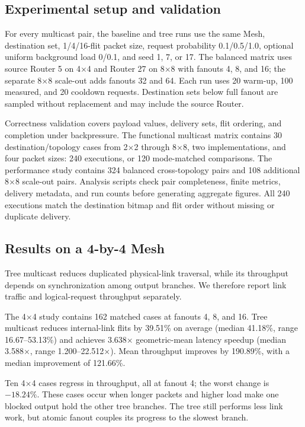 \documentclass[10pt]{article}
\begin{document}
\subsection{Experimental setup and validation}

For every multicast pair, the baseline and tree runs use the same Mesh,
destination set, 1/4/16-flit packet size, request probability
0.1/0.5/1.0, optional uniform background load 0/0.1, and seed 1, 7, or 17.
The balanced matrix uses source Router 5 on 4$\times$4 and Router 27 on
8$\times$8 with fanouts 4, 8, and 16; the separate 8$\times$8 scale-out adds
fanouts 32 and 64.  Each run uses 20 warm-up, 100 measured, and 20 cooldown
requests.  Destination sets below full fanout are sampled without replacement
and may include the source Router.

Correctness validation covers payload values, delivery sets, flit ordering,
and completion under backpressure.  The functional multicast matrix contains
30 destination/topology cases from 2$\times$2 through 8$\times$8, two
implementations, and four packet sizes: 240 executions, or 120 mode-matched
comparisons.  The performance study contains 324 balanced cross-topology pairs
and 108 additional 8$\times$8 scale-out pairs.
Analysis scripts check pair completeness, finite metrics, delivery metadata,
and run counts before generating aggregate figures.  All 240 executions match
the destination bitmap and flit order without missing or duplicate delivery.

\subsection{Results on a 4-by-4 Mesh}


Tree multicast reduces duplicated physical-link traversal, while its throughput
depends on synchronization among output branches.  We therefore report link
traffic and logical-request throughput separately.

The 4$\times$4 study contains 162 matched cases at fanouts 4, 8, and 16.  Tree
multicast reduces internal-link flits by 39.51\% on average (median 41.18\%,
range 16.67--53.13\%) and achieves 3.638$\times$ geometric-mean latency
speedup (median 3.588$\times$, range 1.200--22.512$\times$).  Mean throughput
improves by 190.89\%, with a median improvement of 121.66\%.

Ten 4$\times$4 cases regress in throughput, all at fanout 4; the worst change
is $-18.24\%$.  These cases occur when longer packets and higher load make one
blocked output hold the other tree branches.  The tree still performs less
link work, but atomic fanout couples its progress to the slowest branch.
\end{document}
